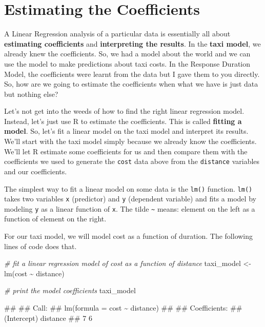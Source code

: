 \documentclass[
]{book}
\newenvironment{Shaded}{\begin{snugshade}}{\end{snugshade}}
\newcommand{\CommentTok}[1]{\textcolor[rgb]{0.56,0.35,0.01}{\textit{#1}}}
\newcommand{\FunctionTok}[1]{\textcolor[rgb]{0.00,0.00,0.00}{#1}}
\newcommand{\NormalTok}[1]{#1}
\newcommand{\OtherTok}[1]{\textcolor[rgb]{0.56,0.35,0.01}{#1}}
\newcommand{\SpecialCharTok}[1]{\textcolor[rgb]{0.00,0.00,0.00}{#1}}
\begin{document}
\hypertarget{estimating-the-coefficients}{%
\section{Estimating the Coefficients}\label{estimating-the-coefficients}}

A Linear Regression analysis of a particular data is essentially all about \textbf{estimating coefficients} and \textbf{interpreting the results}. In the \textbf{taxi model}, we already knew the coefficients. So, we had a model about the world and we can use the model to make predictions about taxi costs. In the Response Duration Model, the coefficients were learnt from the data but I gave them to you directly. So, how are we going to estimate the coefficients when what we have is just data but nothing else?

Let's not get into the weeds of how to find the right linear regression model. Instead, let's just use R to estimate the coefficients. This is called \textbf{fitting a model}. So, let's fit a linear model on the taxi model and interpret its results. We'll start with the taxi model simply because we already know the coefficients. We'll let R estimate some coefficients for us and then compare them with the coefficients we used to generate the \texttt{cost} data above from the \texttt{distance} variables and our coefficients.

The simplest way to fit a linear model on some data is the \texttt{lm()} function. \texttt{lm()} takes two variables \texttt{x} (predictor) and \texttt{y} (dependent variable) and fits a model by modeling \texttt{y} as a linear function of \texttt{x}. The tilde \texttt{\textasciitilde{}} means: element on the left as a function of element on the right.

For our taxi model, we will model cost as a function of duration. The following lines of code does that.

\begin{Shaded}
\begin{Highlighting}[]
\CommentTok{\# fit a linear regression model of cost as a function of distance}
\NormalTok{taxi\_model }\OtherTok{\textless{}{-}} \FunctionTok{lm}\NormalTok{(cost }\SpecialCharTok{\textasciitilde{}}\NormalTok{ distance)}

\CommentTok{\# print the model coefficients}
\NormalTok{taxi\_model}
\end{Highlighting}
\end{Shaded}

\begin{Shaded}
\begin{Highlighting}[]
\NormalTok{\#\# }
\NormalTok{\#\# Call:}
\NormalTok{\#\# lm(formula = cost \textasciitilde{} distance)}
\NormalTok{\#\# }
\NormalTok{\#\# Coefficients:}
\NormalTok{\#\# (Intercept)     distance  }
\NormalTok{\#\#           7            6}
\end{Highlighting}
\end{Shaded}
\end{document}
